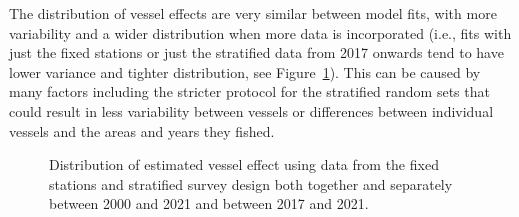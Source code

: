 \documentclass[12pt]{article}\usepackage[]{graphicx}\usepackage[]{color}
\begin{document}
The distribution of vessel effects are very similar between model fits, with more variability and a wider distribution when more data is incorporated (i.e., fits with just the fixed stations or just the stratified data from 2017 onwards tend to have lower variance and tighter distribution, see Figure~\ref{fig:vess-eff}). This can be caused by many factors including the stricter protocol for the stratified random sets that could result in less variability between vessels or differences between individual vessels and the areas and years they fished.
\begin{figure}[htb]

{\centering {}  

}

\caption{Distribution of estimated vessel effect using data from the fixed stations and stratified survey design both together and separately between 2000 and 2021 and between 2017 and 2021.}\label{fig:vess-eff}
\end{figure}
\end{document}
